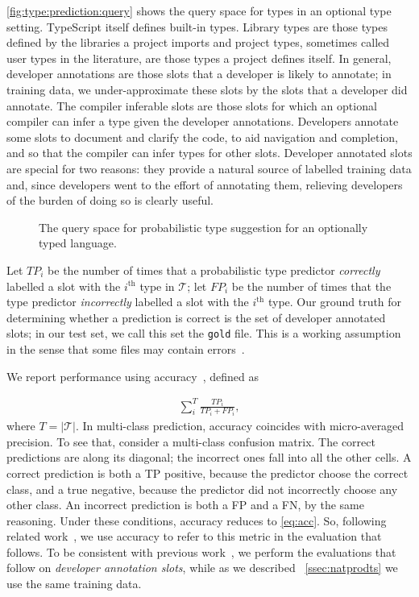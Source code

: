 \documentclass[acmsmall, review, anonymous]{acmart}\settopmatter{printfolios=true,printccs=false,printacmref=false}
\begin{document}
\autoref{fig:type:prediction:query} shows the query space for types in an optional type setting.
TypeScript itself defines built-in types.  Library types are those types defined by the libraries a project imports and project types, sometimes called user types in the literature, are those types a project defines itself. 
In general, developer annotations are those slots that a developer is likely to annotate; in training data, we under-approximate these slots by the slots that a developer did annotate. 
The compiler inferable slots are those slots for which an optional compiler can infer a type given the developer annotations.  
Developers annotate some slots to document and clarify the code, to aid navigation and completion, and so that the compiler can infer types for other slots.  
Developer annotated slots are special for two reasons:  they provide a natural source of labelled training data and, since developers went to the effort of annotating them, relieving developers of the burden of doing so is clearly useful.

\begin{figure}[t]
    \centering
    \def\svgwidth{0.8\linewidth}
    
    \caption{The query space for probabilistic type suggestion for an optionally typed language.}
    \label{fig:type:prediction:query}
\end{figure}

Let $\mathit{TP_i}$ be the number of times that a probabilistic type predictor \emph{correctly} labelled a slot with the $i^\text{th}$ type in $\mathcal{T}$;  let $\mathit{FP_i}$ be the number of times that the type predictor \emph{incorrectly} labelled a slot with the $i^\text{th}$ type.  Our ground truth for determining whether a prediction is correct is the set of developer annotated slots; in our test set, we call this set the \texttt{gold} file. 
This is a working assumption in the sense that some files may contain errors~\cite{williams17}.

We report performance using accuracy~\cite{manning}, defined as 

\begin{align}\label{eq:acc}
    \sum_i^T \frac{\mathit{TP_i}}{\mathit{TP_i} + \mathit{FP_i}},
\end{align}
where $T=|\mathcal{T}|$. In multi-class prediction, accuracy  coincides with micro-averaged precision. To see that, consider a multi-class confusion matrix.  The correct predictions are along its diagonal; the incorrect ones fall into all the other cells.  A correct prediction is both a TP positive, because the predictor choose the correct class, and a true negative, because the predictor did not incorrectly choose any other class.  An incorrect prediction is both a FP and a FN, by the same reasoning.  Under these conditions, accuracy reduces to \eqref{eq:acc}.
So, following related work~\cite{wei20}, we use accuracy to refer to this metric in the evaluation that follows.  To be consistent with previous work~\citep{wei20,hellendoorn18}, we perform the evaluations that follow on \textit{developer annotation slots}, while as we described
~\cref{ssec:natprodts} we use the same training data.
\end{document}
